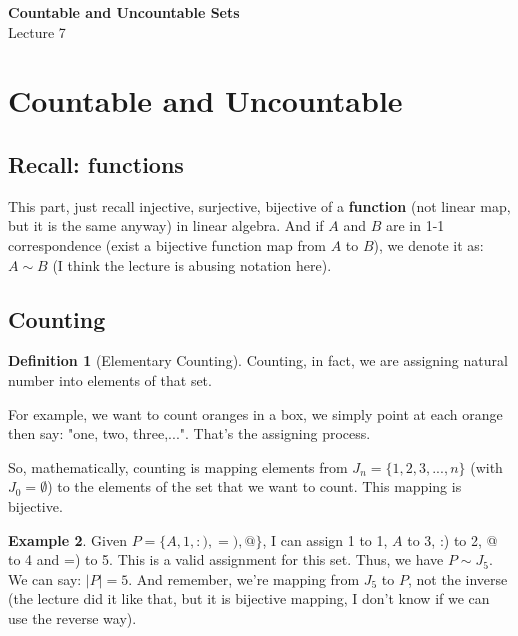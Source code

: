 \documentclass[12pt]{article}
\theoremstyle{definition}
\newtheorem{definition}{Definition}[section]
\newtheorem{example}[definition]{Example}
\theoremstyle{plain}
\begin{document}

\begin{center}
    {\Large \textbf{Countable and Uncountable Sets}}\\[0.5em]
    {\large Lecture 7}
\end{center}

\tableofcontents

\newpage

\section{Countable and Uncountable}
\subsection{Recall: functions}
\begin{note}
This part, just recall injective, surjective, bijective of a \textbf{function} (not linear map, but it is the same anyway) in linear algebra. And if $A$ and $B$ are in 1-1 correspondence (exist a bijective function map from $A$ to $B$), we denote it as: $A \sim B$ (I think the lecture is abusing notation here).

\end{note}

\subsection{Counting}
\begin{definition}[Elementary Counting]
Counting, in fact, we are assigning natural number into elements of that set.

For example, we want to count oranges in a box, we simply point at each orange then say: "one, two, three,...". That's the assigning process.

So, mathematically, counting is mapping elements from $J_n=\{1,2,3,...,n\}$ (with $J_0 = \emptyset$) to the elements of the set that we want to count. This mapping is bijective.
\end{definition}

\begin{example}
Given $P =\{A, 1, :), =), @\}$, I can assign 1 to 1, $A$ to 3, :) to 2, @ to 4 and =) to 5. This is a valid assignment for this set. Thus, we have $P \sim J_5$. We can say: $|P| = 5$. And remember, we're mapping from $J_5$ to $P$, not the inverse (the lecture did it like that, but it is bijective mapping, I don't know if we can use the reverse way).
\end{example}
\end{document}
